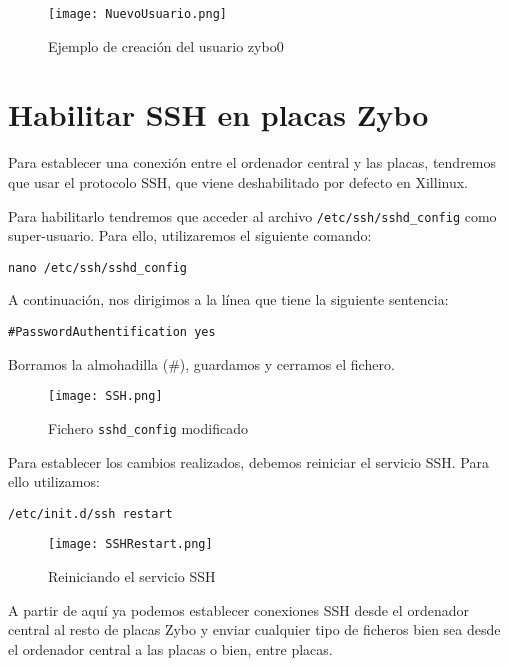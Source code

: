 \documentclass[12pt,letterpaper]{article}
\begin{document}
\begin{figure}[h]
	\centering
	\texttt{[image: NuevoUsuario.png]}
	\caption{Ejemplo de creación del usuario zybo0}
	\label{Ejemplo de creación del usuario zybo0}
\end{figure}


\section{Habilitar SSH en placas Zybo}
Para establecer una conexión entre el ordenador central y las placas, tendremos que usar el protocolo SSH, que viene deshabilitado por defecto en Xillinux.

Para habilitarlo tendremos que acceder al archivo \texttt{/etc/ssh/sshd\_config} como super-usuario. Para ello, utilizaremos el siguiente comando:
\begin{center}
	\texttt{nano /etc/ssh/sshd\_config}
\end{center}
A continuación, nos dirigimos a la línea que tiene la siguiente sentencia:
\begin{center}
	\texttt{\#PasswordAuthentification yes}
\end{center}
Borramos la almohadilla (\#), guardamos y cerramos el fichero.
\begin{figure}[h]
	\centering
	\texttt{[image: SSH.png]}
	\caption{Fichero \texttt{sshd\_config} modificado}
	\label{Fichero ssh_d modificado}
\end{figure}

Para establecer los cambios realizados, debemos reiniciar el servicio SSH. Para ello utilizamos:
\begin{center}
	\texttt{/etc/init.d/ssh restart}
\end{center}
\begin{figure}[h]
	\centering
	\texttt{[image: SSHRestart.png]}
	\caption{Reiniciando el servicio SSH}
	\label{Reiniciando el servicio SSH}
\end{figure}

A partir de aquí ya podemos establecer conexiones SSH desde el ordenador central al resto de placas Zybo y enviar cualquier tipo de ficheros bien sea desde el ordenador central a las placas o bien, entre placas.
\end{document}
